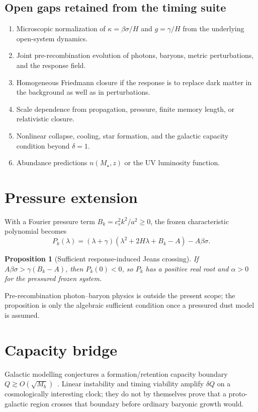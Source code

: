 \documentclass[11pt]{article}
\newtheorem{proposition}[theorem]{Proposition}
\theoremstyle{definition}
\theoremstyle{remark}
\begin{document}
\subsection{Open gaps retained from the timing suite}
\begin{enumerate}[label=(\arabic*)]
\item Microscopic normalization of $\kappa=\beta\sigma/H$ and $g=\gamma/H$ from the underlying open-system dynamics.
\item Joint pre-recombination evolution of photons, baryons, metric perturbations, and the response field.
\item Homogeneous Friedmann closure if the response is to replace dark matter in the background as well as in perturbations.
\item Scale dependence from propagation, pressure, finite memory length, or relativistic closure.
\item Nonlinear collapse, cooling, star formation, and the galactic capacity condition beyond $\delta=1$.
\item Abundance predictions $n(M_\star,z)$ or the UV luminosity function.
\end{enumerate}

\section{Pressure extension}
\label{sec:jeans}
With a Fourier pressure term $B_k=c_s^2k^2/a^2\ge0$, the frozen characteristic polynomial becomes
\begin{equation}
P_k(\lambda)=(\lambda+\gamma)(\lambda^2+2H\lambda+B_k-A)-A\beta\sigma.
\end{equation}

\begin{proposition}[Sufficient response-induced Jeans crossing]
\label{prop:jeans}
If $A\beta\sigma>\gamma(B_k-A)$, then $P_k(0)<0$, so $P_k$ has a positive real root and $\alpha>0$ for the pressured frozen system.
\end{proposition}

Pre-recombination photon--baryon physics is outside the present scope; the proposition is only the algebraic sufficient condition once a pressured dust model is assumed.

\section{Capacity bridge}
\label{sec:bridge}
Galactic modelling conjectures a formation/retention capacity boundary $Q\gtrsim O(\sqrt{M_b})$~\cite{boyd2026galactic}.
Linear instability and timing viability amplify $\delta Q$ on a cosmologically interesting clock; they do not by themselves prove that a proto-galactic region crosses that boundary before ordinary baryonic growth would.
\end{document}

